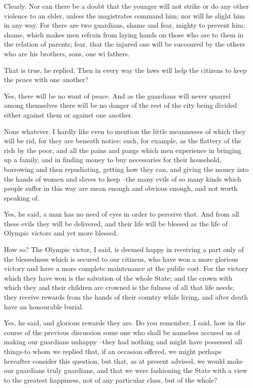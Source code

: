Clearly.
Nor can there be a doubt that the younger will not strike or do any other violence to an elder, unless the magistrates command him; nor will he slight him in any way. For there are two guardians, shame and fear, mighty to prevent him: shame, which makes men refrain from laying hands on those who are to them in the relation of parents; fear, that the injured one will be succoured by the others who are his brothers, sons, one wi fathers.

That is true, he replied.
Then in every way the laws will help the citizens to keep the peace with one another?

Yes, there will be no want of peace.
And as the guardians will never quarrel among themselves there will be no danger of the rest of the city being divided either against them or against one another.

None whatever.
I hardly like even to mention the little meannesses of which they will be rid, for they are beneath notice: such, for example, as the flattery of the rich by the poor, and all the pains and pangs which men experience in bringing up a family, and in finding money to buy necessaries for their household, borrowing and then repudiating, getting how they can, and giving the money into the hands of women and slaves to keep --the many evils of so many kinds which people suffer in this way are mean enough and obvious enough, and not worth speaking of.

Yes, he said, a man has no need of eyes in order to perceive that.
And from all these evils they will be delivered, and their life will be blessed as the life of Olympic victors and yet more blessed.

How so?
The Olympic victor, I said, is deemed happy in receiving a part only of the blessedness which is secured to our citizens, who have won a more glorious victory and have a more complete maintenance at the public cost. For the victory which they have won is the salvation of the whole State; and the crown with which they and their children are crowned is the fulness of all that life needs; they receive rewards from the hands of their country while living, and after death have an honourable burial.

Yes, he said, and glorious rewards they are.
Do you remember, I said, how in the course of the previous discussion some one who shall be nameless accused us of making our guardians unhappy --they had nothing and might have possessed all things-to whom we replied that, if an occasion offered, we might perhaps hereafter consider this question, but that, as at present advised, we would make our guardians truly guardians, and that we were fashioning the State with a view to the greatest happiness, not of any particular class, but of the whole?

